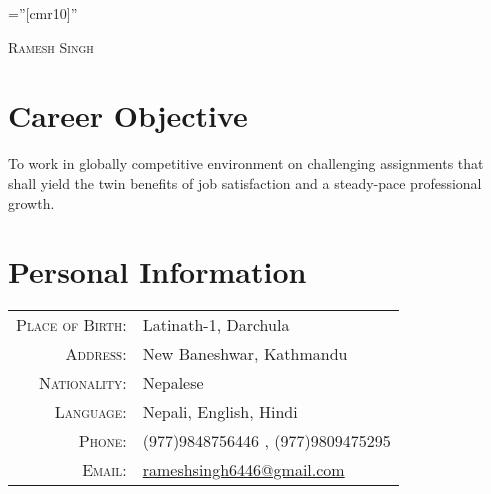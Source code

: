 \documentclass[a4paper,10pt]{article}
\begin{document}

\pagestyle{empty} %

\font\fb=''[cmr10]'' %

\par{\centering
		{\huge \textsc{Ramesh} \textsc{Singh}
	}\bigskip\par}


\section{Career Objective}
To work in globally competitive environment on challenging assignments that shall yield the twin benefits of job satisfaction and a steady-pace professional growth.

\section{Personal Information}
\begin{tabular}{rl}
    \textsc{Place of Birth:} & Latinath-1, Darchula \\
    \textsc{Address:}   & New Baneshwar, Kathmandu \\
    \textsc{Nationality:} & Nepalese\\
    \textsc{Language:} & Nepali, English, Hindi\\
    \textsc{Phone:}     & (977)9848756446 , (977)9809475295\\
    \textsc{Email:}     & \href{mailto:rameshsingh6446@gmail.com}{rameshsingh6446@gmail.com}\\
\end{tabular}

\end{document}
